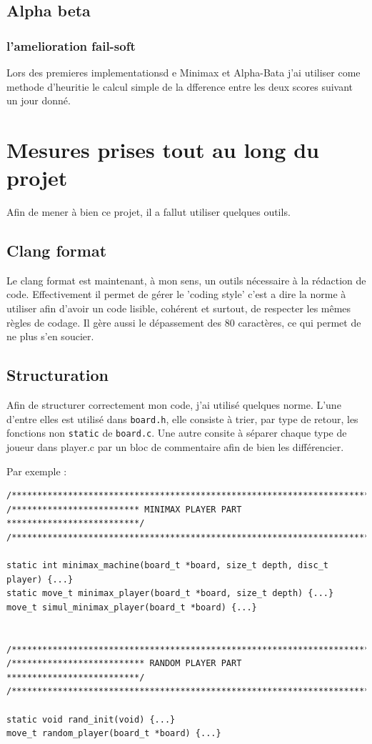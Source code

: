 \documentclass{report}
\begin{document}
\section{Alpha beta}
\subsection{l'amelioration fail-soft}

Lors des premieres implementationsd e Minimax et Alpha-Bata j'ai utiliser come methode d'heuritie le calcul simple de la dfference entre les deux scores suivant un jour donné.

\chapter{Mesures prises tout au long du projet}

Afin de mener à bien ce projet, il a fallut utiliser quelques outils.

\section{Clang format}
Le clang format est maintenant, à mon sens, un outils nécessaire à la rédaction de code. Effectivement il permet de gérer le 'coding style' c'est a dire la norme à utiliser afin d'avoir un code lisible, cohérent et surtout, de respecter les mêmes règles de codage. Il gère aussi le dépassement des 80 caractères, ce qui permet de ne plus s'en soucier.

\section{Structuration}
Afin de structurer correctement mon code, j'ai utilisé quelques norme. L'une d'entre elles est utilisé dans \texttt{board.h}, elle consiste à trier, par type de retour, les fonctions non \texttt{static} de \texttt{board.c}. Une autre consite à séparer chaque type de joueur dans player.c par un bloc de commentaire afin de bien les différencier.\newline

Par exemple : \newline

\begin{lstlisting}
/************************************************************************/
/************************* MINIMAX PLAYER PART **************************/
/************************************************************************/

static int minimax_machine(board_t *board, size_t depth, disc_t player) {...}
static move_t minimax_player(board_t *board, size_t depth) {...}
move_t simul_minimax_player(board_t *board) {...}


/************************************************************************/
/************************** RANDOM PLAYER PART **************************/
/************************************************************************/

static void rand_init(void) {...}
move_t random_player(board_t *board) {...}
\end{lstlisting}
\end{document}
